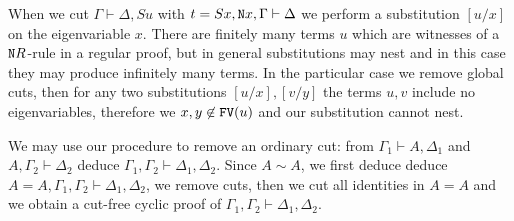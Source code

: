 \documentclass[a4paper,12pt]{article}
\newcommand{\Nat}               { {\tt N}  }
\newcommand{\FV}              { {\tt FV} }
\begin{document}


When we cut $\Gamma \vdash \Delta, Su$ with $t=Sx, \Nat x, \Gamma \vdash \Delta$ we perform a substitution $[u/x]$ on the eigenvariable $x$. There are finitely many terms $u$ which are witnesses of a $\Nat R$-rule in a regular proof, but in general substitutions may nest and in this case they may produce infinitely many terms. In the particular case we remove global cuts, then for any two substitutions $[u/x], [v/y]$ the terms $u,v$ include no eigenvariables, therefore we $x,y \not \in \FV(u)$ and our substitution cannot nest.


We may use our procedure to remove an ordinary cut: from $\Gamma_1 \vdash A, \Delta_1$ and $A, \Gamma_2 \vdash \Delta_2$ deduce  $\Gamma_1, \Gamma_2 \vdash \Delta_1, \Delta_2$. Since $A \sim A $, we first deduce deduce  $A=A, \Gamma_1, \Gamma_2 \vdash \Delta_1, \Delta_2$, we remove cuts, then we cut all identities in $A=A$ and we obtain a cut-free cyclic proof of $\Gamma_1, \Gamma_2 \vdash \Delta_1, \Delta_2$.
\end{document}
